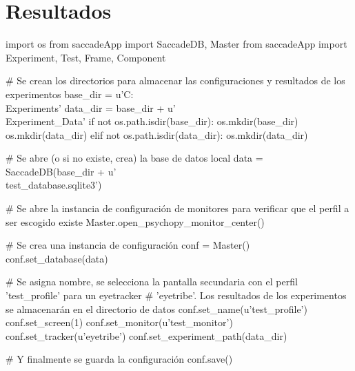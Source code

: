 \documentclass[\main/main.tex]{subfiles}
\begin{document}
\chapter{Resultados}
\label{cha:04_resultados}
	
	


	\begin{python}[caption=Crear la carpeta del experimento y la base de datos., captionpos=b, label=alg:04_new_db]
	import os
    from saccadeApp import SaccadeDB, Master
    from saccadeApp import Experiment, Test, Frame, Component

    # Se crean los directorios para almacenar las configuraciones y resultados de los experimentos
    base_dir = u'C:\\Experiments'
    data_dir = base_dir + u'\\Experiment_Data'
    if not os.path.isdir(base_dir):
        os.mkdir(base_dir)
        os.mkdir(data_dir)
    elif not os.path.isdir(data_dir):
        os.mkdir(data_dir)

    # Se abre (o si no existe, crea) la base de datos local
    data = SaccadeDB(base_dir + u'\\test_database.sqlite3')

	\end{python}

	\begin{python}[caption=Comprobar las configuraciones de los monitores., captionpos=b, label=alg:04_check_monitor]
	# Se abre la instancia de configuración de monitores para verificar que el perfil a ser escogido existe
    Master.open_psychopy_monitor_center()

	\end{python}


	\begin{python}[caption=Crear un nuevo perfil de configuración., captionpos=b, label=alg:04_new_conf]
	# Se crea una instancia de configuración
    conf = Master()
    conf.set_database(data)

    # Se asigna nombre, se selecciona la pantalla secundaria con el perfil 'test_profile' para un eyetracker
    # 'eyetribe'. Los resultados de los experimentos se almacenarán en el directorio de datos
    conf.set_name(u'test_profile')
    conf.set_screen(1)
    conf.set_monitor(u'test_monitor')
    conf.set_tracker(u'eyetribe')
    conf.set_experiment_path(data_dir)

    # Y finalmente se guarda la configuración
    conf.save()

	\end{python}
\end{document}
